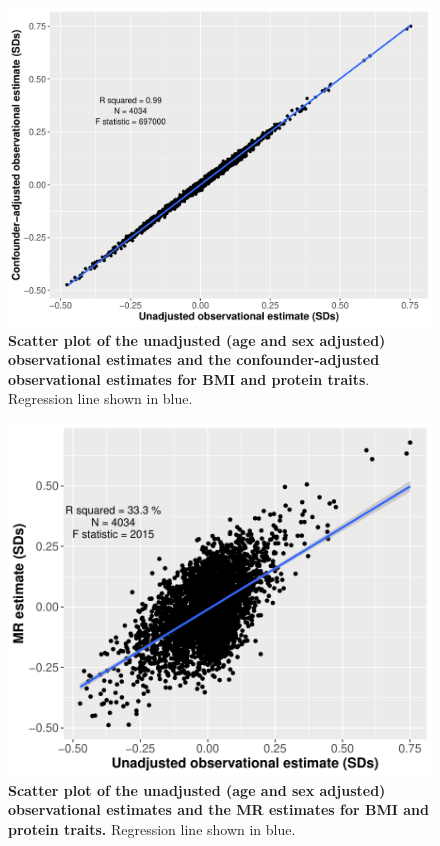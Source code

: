 \documentclass[11pt,twoside]{bristolthesis}
\begin{document}
\begin{figure}

{\centering \includegraphics[width=0.65\linewidth]{figure/BMI_protein_INTERVAL/obs_v_obs_adj_scatter} 

}

\caption[Scatter plot comparing the unadjusted and confounder-adjusted observational BMI-protein estimates]{\textbf{Scatter plot of the unadjusted (age and sex adjusted) observational estimates and the confounder-adjusted observational estimates for BMI and protein traits}. Regression line shown in blue.}\label{fig:Estimate-comparison-obs}
\end{figure}


\begin{figure}

{\centering \includegraphics[width=0.65\linewidth]{figure/BMI_protein_INTERVAL/unadj_obs_MR_scatter_small} 

}

\caption[Scatter plot comparing the observational and MR BMI-protein estimates]{\textbf{Scatter plot of the unadjusted (age and sex adjusted) observational estimates and the MR estimates for BMI and protein traits.} Regression line shown in blue.}\label{fig:Estimate-comparison-obs-mr}
\end{figure}
\end{document}
